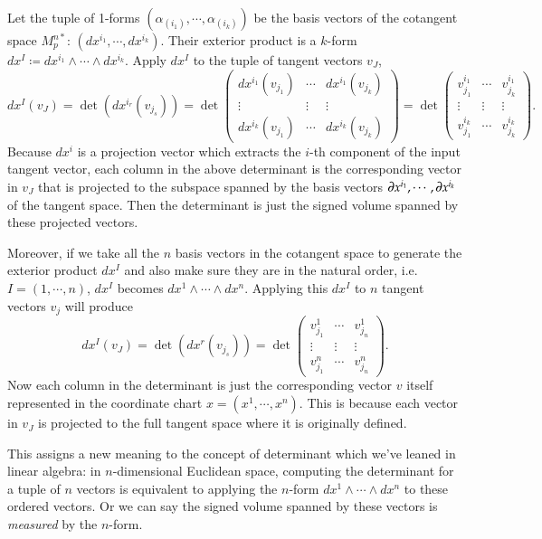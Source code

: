 \documentclass[11pt, a4paper]{book}
\begin{document}
\begin{Example}
    \label{exam:apply-exterior-product-of-cotangent-space-basis-to-k-vectors}
  Let the tuple of 1-forms $\left( \alpha_{(i_1)},\cdots,\alpha_{(i_k)} \right)$ be the
  basis vectors of the cotangent space $M_p^{n*}$: $(dx^{i_1},\cdots,dx^{i_k})$. Their
  exterior product is a $k$-form $dx^I \coloneqq dx^{i_1} \wedge\cdots\wedge dx^{i_k}$.
  Apply $dx^I$ to the tuple of tangent vectors $v_J$,
  \begin{equation}
    dx^I(v_J) = \det(dx^{i_r}(v_{j_s})) = \det \begin{pmatrix}
      dx^{i_1}(v_{j_1}) & \cdots & dx^{i_1}(v_{j_k}) \\
      \vdots & \vdots & \vdots \\
      dx^{i_k}(v_{j_1}) & \cdots & dx^{i_k}(v_{j_k})
    \end{pmatrix} = \det \begin{pmatrix}
      v_{j_1}^{i_1} & \cdots & v_{j_k}^{i_1} \\
      \vdots & \vdots & \vdots \\
      v_{j_1}^{i_k} & \cdots & v_{j_k}^{i_k}
    \end{pmatrix}.
  \end{equation}
  Because $dx^i$ is a projection vector which extracts the $i$-th component of the input
  tangent vector, each column in the above determinant is the corresponding vector in
  $v_J$ that is projected to the subspace spanned by the basis vectors
  $\boldsymbol{\partial}x^{i_1},\cdots,\boldsymbol{\partial}x^{i_k}$ of the tangent space. Then the
  determinant is just the signed volume spanned by these projected vectors.

  Moreover, if we take all the $n$ basis vectors in the cotangent space to generate the
  exterior product $dx^I$ and also make sure they are in the natural order, i.e.
  $I=(1,\cdots,n)$, $dx^I$ becomes $dx^1\wedge\cdots\wedge dx^n$. Applying this $dx^I$ to
  $n$ tangent vectors $v_j$ will produce
  \begin{equation}
    dx^I(v_J) = \det(dx^r(v_{j_s})) = \det \begin{pmatrix}
      v_{j_1}^{1} & \cdots & v_{j_n}^{1} \\
      \vdots & \vdots & \vdots \\
      v_{j_1}^{n} & \cdots & v_{j_n}^{n}
    \end{pmatrix}.
  \end{equation}
  Now each column in the determinant is just the corresponding vector $v$ itself
  represented in the coordinate chart $x=(x^1,\cdots,x^n)$. This is because each vector in
  $v_J$ is projected to the full tangent space where it is originally defined.

  This assigns a new meaning to the concept of determinant which we've leaned in linear
  algebra: in $n$-dimensional Euclidean space, computing the determinant for a tuple of
  $n$ vectors is equivalent to applying the $n$-form $dx^1 \wedge\cdots\wedge dx^n$ to
  these ordered vectors. Or we can say the signed volume spanned by these vectors is
  \emph{measured} by the $n$-form.
\end{Example}
\end{document}
